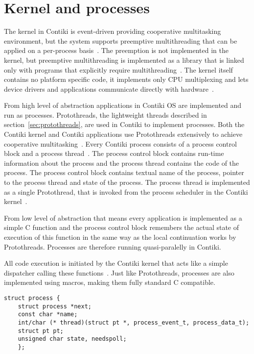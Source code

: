 
\section{Kernel and processes}
The kernel in Contiki is event-driven providing cooperative multitasking
environment, but the system supports preemptive
multithreading that can be applied on a per-process basis~\cite{video}.
The preemption is not implemented in the kernel, but
preemptive multithreading is implemented as a library that is linked only with programs that
explicitly require multithreading~\cite{paper-contiki}.
The kernel itself contains no platform specific code, it implements only CPU multiplexing and
lets device drivers and applications communicate directly with hardware~\cite{video}.

From high level of abstraction
applications in Contiki OS are implemented and run as processes.
Protothreads, the lightweight threads described in section~\ref{sec:protothreads},
are used in Contiki to implement processes.
Both the Contiki kernel and Contiki applications use
Protothreads extensively to achieve cooperative multitasking~\cite{contiki-wiki-faq}.
Every Contiki process consists of a process control block and a process thread~\cite{contiki-wiki-processes}.
The process control block contains run-time information about the process and
the process thread contains the code of the process.
The process control block contains
textual name of the process, pointer to the process thread and state of the process.
The process thread is implemented as a single Protothread,
that is invoked from the process scheduler in the Contiki kernel~\cite{contiki-wiki-processes}.

From low level of abstraction that means
every application is implemented as a simple C function
and the process control block remembers the actual state of execution of this function
in the same way as the local continuation works by Protothreads.
Processes are therefore running quasi-paralelly in Contiki.

All code execution is initiated by the Contiki kernel
that acts like a simple dispatcher calling these functions~\cite{contiki-docs}.
Just like Protothreads, processes are also implemented using macros,
making them fully standard C compatible.
\begin{lstlisting}
struct process {
	struct process *next;
	const char *name;
	int/char (* thread)(struct pt *, process_event_t, process_data_t);
	struct pt pt;
	unsigned char state, needspoll;
	};
\end{lstlisting}

